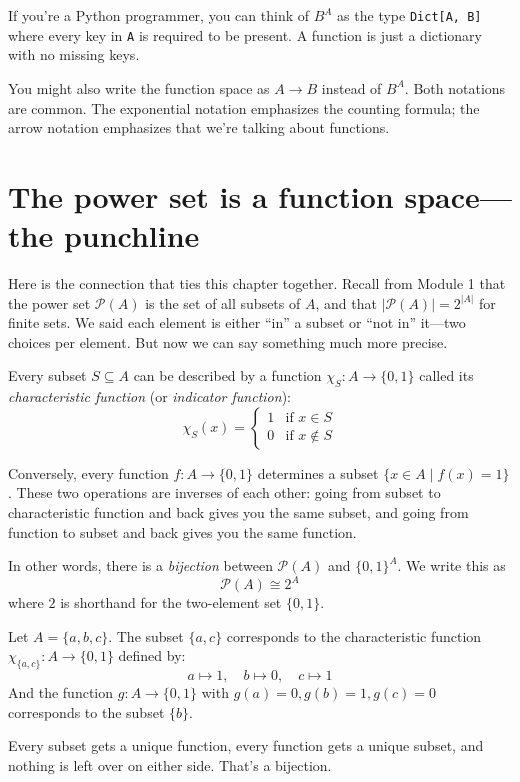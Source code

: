 \documentclass[11pt]{article}
\begin{document}
If you're a Python programmer, you can think of $B^A$ as the type \texttt{Dict[A, B]} where every key in \texttt{A} is required to be present. A function is just a dictionary with no missing keys.

You might also write the function space as $A \to B$ instead of $B^A$. Both notations are common. The exponential notation emphasizes the counting formula; the arrow notation emphasizes that we're talking about functions.

\section{The power set is a function space---the punchline}

Here is the connection that ties this chapter together. Recall from Module 1 that the power set $\mathcal{P}(A)$ is the set of all subsets of $A$, and that $|\mathcal{P}(A)| = 2^{|A|}$ for finite sets. We said each element is either ``in'' a subset or ``not in'' it---two choices per element. But now we can say something much more precise.

Every subset $S \subseteq A$ can be described by a function $\chi_S : A \to \{0, 1\}$ called its \emph{characteristic function} (or \emph{indicator function}):
\[
\chi_S(x) = \begin{cases} 1 & \text{if } x \in S \\ 0 & \text{if } x \notin S \end{cases}
\]

Conversely, every function $f : A \to \{0, 1\}$ determines a subset $\{x \in A \mid f(x) = 1\}$. These two operations are inverses of each other: going from subset to characteristic function and back gives you the same subset, and going from function to subset and back gives you the same function.

In other words, there is a \emph{bijection} between $\mathcal{P}(A)$ and $\{0,1\}^A$. We write this as
\[
\mathcal{P}(A) \cong 2^A
\]
where $2$ is shorthand for the two-element set $\{0,1\}$.

\begin{example}
Let $A = \{a, b, c\}$. The subset $\{a, c\}$ corresponds to the characteristic function $\chi_{\{a,c\}} : A \to \{0,1\}$ defined by:
\[
a \mapsto 1, \quad b \mapsto 0, \quad c \mapsto 1
\]
And the function $g : A \to \{0,1\}$ with $g(a) = 0, g(b) = 1, g(c) = 0$ corresponds to the subset $\{b\}$.

Every subset gets a unique function, every function gets a unique subset, and nothing is left over on either side. That's a bijection.
\end{example}
\end{document}
